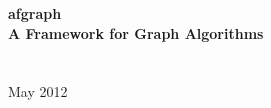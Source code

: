 \documentclass[letterpaper]{article}
\begin{document}
\hypersetup{pageanchor=false}

\begin{titlepage}
\vspace*{3.5cm}
\begin{center}
\textbf{
{\Large afgraph }\\
\vspace*{1cm}
{\large A Framework for Graph Algorithms}\\
\vspace*{2.0cm}
 }\\
\vspace*{5cm}
\\
\vspace*{1cm}
\small{May 2012}
\end{center}
\end{titlepage}
\thispagestyle{empty}
\clearpage\mbox{}\clearpage

\setcounter{page}{1}
\tableofcontents
\newpage
\cleardoublepage

\setcounter{page}{1}
\end{document}
